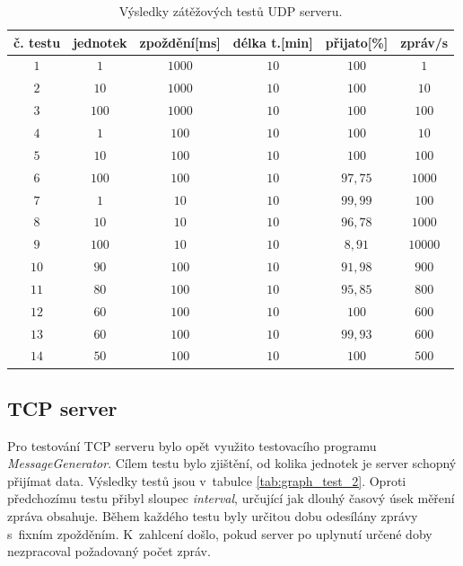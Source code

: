 \begin{table}[h]
    \begin{center}
        \begin{tabular}{|c|c|c|c|c|c|}
        \hline
             č. testu & jednotek & zpoždění[ms] & délka t.[min]& přijato[\%] & zpráv/s\\ \hline
             $1$ & $1$ & $1000$ & $10$ & $100$ & $1$\\\hline
             $2$ & $10$ & $1000$ & $10$ & $100$ & $10$  \\\hline
             $3$ & $100$ & $1000$ & $10$ & $100$ & $100$  \\\hline
             $4$ & $1$ & $100$ & $10$ & $100$ & $10$  \\\hline
             $5$ & $10$ & $100$ & $10$ & $100$ & $100$ \\\hline
             $6$ & $100$ & $100$ & $10$ & $97,75$ & $1000$  \\\hline
             $7$ & $1$ & $10$ & $10$ & $99,99$ & $100$  \\ \hline
             $8$ & $10$ & $10$ & $10$ & $96,78$ & $1000$  \\ \hline
             $9$ & $100$ & $10$ & $10$ & $8,91$ & $10000$ \\ \hline
             $10$ & $90$ & $100$ & $10$ & $91,98$ & $900$ \\ \hline
             $11$ & $80$ & $100$ & $10$ & $95,85$ & $800$ \\ \hline
             $12$ & $60$ & $100$ & $10$ & $100$ & $600$ \\ \hline \hline
             $13$ & $60$ & $100$ & $10$ & $99,93$ & $600$ \\ \hline
             $14$ & $50$ & $100$ & $10$ & $100$ & $500$ \\ \hline
        \end{tabular}
        \caption{Výsledky zátěžových testů UDP serveru.} \label{tab:graph_test_1}
    \end{center}
\end{table}

\subsection{TCP server}
Pro testování TCP serveru bylo opět využito testovacího programu \textit{MessageGenerator}. Cílem testu bylo zjištění, od kolika jednotek je server schopný přijímat data. Výsledky testů jsou v~tabulce \ref{tab:graph_test_2}. Oproti předchozímu testu přibyl sloupec \textit{interval}, určující jak dlouhý časový úsek měření zpráva obsahuje. Během každého testu byly určitou dobu odesílány zprávy s~fixním zpožděním. K~zahlcení došlo, pokud server po uplynutí určené doby nezpracoval požadovaný počet zpráv. 

